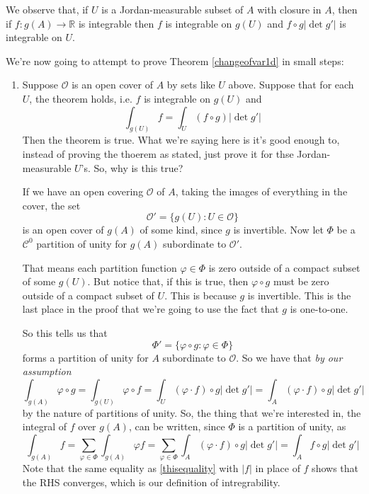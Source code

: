 \documentclass{article}
\newcommand{\reals}[0]{\mathbb{R}}
\newcommand{\mc}[1]{\mathcal{#1}}
\begin{document}
We observe that, if \(U\) is a Jordan-measurable subset of \(A\) with closure in \(A\), then if \(f: g(A) \to \reals\) is integrable then \(f\) is integrable on \(g(U)\) and \(f \circ g|\det g'|\) is integrable on \(U\).

We're now going to attempt to prove Theorem \ref{changeofvar1d} in small steps:
\begin{enumerate}

  \item Suppose \(\mc{O}\) is an open cover of \(A\) by sets like \(U\) above. Suppose that for each \(U\), the theorem holds, i.e. \(f\) is integrable on \(g(U)\) and
  \begin{equation}
    \int_{g(U)}f = \int_U(f \circ g)|\det g'|
  \end{equation}
  Then the theorem is true. What we're saying here is it's good enough to, instead of proving the thoerem as stated, just prove it for thse Jordan-measurable \(U\)'s. So, why is this true?

  If we have an open covering \(\mc{O}\) of \(A\), taking the images of everything in the cover, the set
  \begin{equation}
    \mc{O}' = \{g(U) : U \in \mc{O}\}
  \end{equation}
  is an open cover of \(g(A)\) of some kind, since \(g\) is invertible. Now let \(\Phi\) be a \(\mc{C}^0\) partition of unity for \(g(A)\) subordinate to \(\mc{O}'\).

  That means each partition function \(\varphi \in \Phi\) is zero outside of a compact subset of some \(g(U)\). But notice that, if this is true, then \(\varphi \circ g\) must be zero outside of a compact subset of \(U\). This is because \(g\) is invertible. This is the last place in the proof that we're going to use the fact that \(g\) is one-to-one.

  So this tells us that
  \begin{equation}
    \Phi' = \{\varphi \circ g : \varphi \in \Phi\}
  \end{equation}
  forms a partition of unity for \(A\) subordinate to \(\mc{O}\). So we have that \textit{by our assumption}
  \begin{equation}
    \int_{g(A)}\varphi \circ g = \int_{g(U)}\varphi \circ f = \int_U(\varphi \cdot f) \circ g|\det g'| = \int_A(\varphi \cdot f) \circ g|\det g'|
  \end{equation}
  by the nature of partitions of unity. So, the thing that we're interested in, the integral of \(f\) over \(g(A)\), can be written, since \(\Phi\) is a partition of unity, as
  \begin{equation}
    \int_{g(A)}f = \sum_{\varphi \in \Phi}\int_{g(A)}\varphi f = \sum_{\varphi \in \Phi}\int_A(\varphi \cdot f) \circ g|\det g'| = \int_Af \circ g|\det g'|
    \label{thisequality}
  \end{equation}
  Note that the same equality as \ref{thisequality} with \(|f|\) in place of \(f\) shows that the RHS converges, which is our definition of intregrability.


\end{enumerate}
\end{document}
